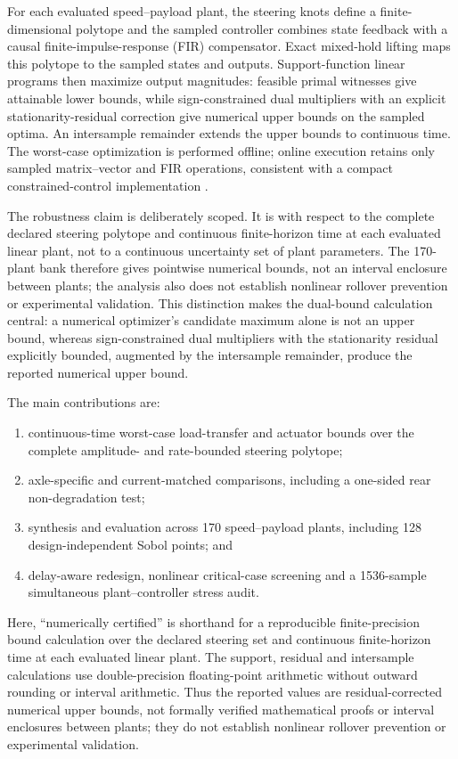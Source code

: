 \documentclass[fleqn,final,5p,times]{elsarticle}
\begin{document}
For each evaluated speed--payload plant, the steering knots define a finite-dimensional polytope and the sampled controller combines state feedback with a causal finite-impulse-response (FIR) compensator. Exact mixed-hold lifting maps this polytope to the sampled states and outputs. Support-function linear programs then maximize output magnitudes: feasible primal witnesses give attainable lower bounds, while sign-constrained dual multipliers with an explicit stationarity-residual correction give numerical upper bounds on the sampled optima. An intersample remainder extends the upper bounds to continuous time. The worst-case optimization is performed offline; online execution retains only sampled matrix--vector and FIR operations, consistent with a compact constrained-control implementation \cite{lu2025}.

The robustness claim is deliberately scoped. It is with respect to the complete declared steering polytope and continuous finite-horizon time at each evaluated linear plant, not to a continuous uncertainty set of plant parameters. The 170-plant bank therefore gives pointwise numerical bounds, not an interval enclosure between plants; the analysis also does not establish nonlinear rollover prevention or experimental validation. This distinction makes the dual-bound calculation central: a numerical optimizer's candidate maximum alone is not an upper bound, whereas sign-constrained dual multipliers with the stationarity residual explicitly bounded, augmented by the intersample remainder, produce the reported numerical upper bound.

The main contributions are:
\begin{enumerate}
\item continuous-time worst-case load-transfer and actuator bounds over the complete amplitude- and rate-bounded steering polytope;
\item axle-specific and current-matched comparisons, including a one-sided rear non-degradation test;
\item synthesis and evaluation across 170 speed--payload plants, including 128 design-independent Sobol points; and
\item delay-aware redesign, nonlinear critical-case screening and a 1536-sample simultaneous plant--controller stress audit.
\end{enumerate}
Here, ``numerically certified'' is shorthand for a reproducible finite-precision bound calculation over the declared steering set and continuous finite-horizon time at each evaluated linear plant. The support, residual and intersample calculations use double-precision floating-point arithmetic without outward rounding or interval arithmetic. Thus the reported values are residual-corrected numerical upper bounds, not formally verified mathematical proofs or interval enclosures between plants; they do not establish nonlinear rollover prevention or experimental validation.
\end{document}
